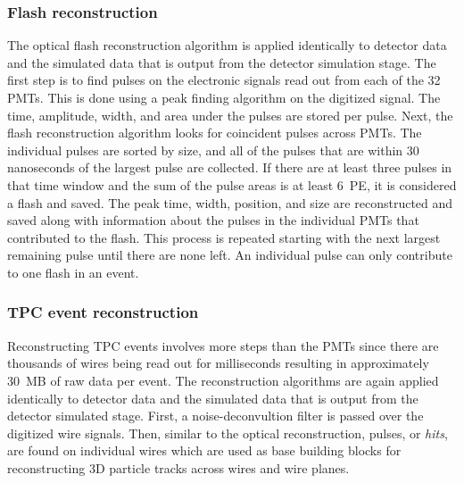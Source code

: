   \subsubsection{Flash reconstruction}
    The optical flash reconstruction algorithm is applied identically to
    detector data and the simulated data that is output from the detector
    simulation stage.  The first step is to find pulses on the electronic
    signals read out from each of the 32 PMTs. This is done using a peak
    finding algorithm on the digitized signal. The time, amplitude, width, and
    area under the pulses are stored per pulse. Next, the flash reconstruction
    algorithm looks for coincident pulses across PMTs. The individual pulses
    are sorted by size, and all of the pulses that are within 30 nanoseconds of
    the largest pulse are collected. If there are at least three pulses in that
    time window and the sum of the pulse areas is at least 6~PE, it is considered a
    flash and saved. The peak time, width, position, and size are reconstructed
    and saved along with information about the pulses in the individual PMTs
    that contributed to the flash. This process is repeated starting with the
    next largest remaining pulse until there are none left. An individual pulse
    can only contribute to one flash in an event.

  \subsubsection{TPC event reconstruction}\label{sec:tpcreco}
    Reconstructing TPC events involves more steps than the PMTs since there are
    thousands of wires being read out for milliseconds resulting in
    approximately 30~MB of raw data per event. The reconstruction algorithms
    are again applied identically to detector data and the simulated data that
    is output from the detector simulated stage. First, a noise-deconvultion
    filter is passed over the digitized wire signals. Then, similar to the
    optical reconstruction, pulses, or \textit{hits}, are found on individual
    wires which are used as base building blocks for reconstructing 3D particle
    tracks across wires and wire planes.

